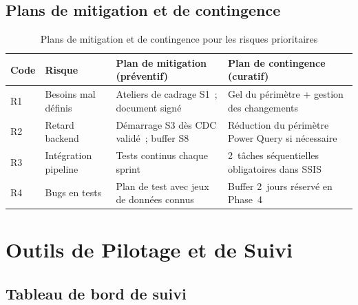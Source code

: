 \documentclass[12pt, a4paper]{report}
\begin{document}
\subsection{Plans de mitigation et de contingence}

\begin{table}[H]
\centering
\caption{Plans de mitigation et de contingence pour les risques prioritaires}
\label{tab:mitigation}
\renewcommand{\arraystretch}{1.4}
\begin{tabularx}{\textwidth}{p{0.7cm} X p{5cm} p{5cm}}
\toprule
\rowcolor{primary!12}
Code & Risque & Plan de mitigation (préventif) & Plan de contingence (curatif) \\
\midrule
R1 & Besoins mal définis & Ateliers de cadrage S1~; document signé & Gel du périmètre + gestion des changements \\
R2 & Retard backend & Démarrage S3 dès CDC validé~; buffer S8 & Réduction du périmètre Power Query si nécessaire \\
R3 & Intégration pipeline & Tests continus chaque sprint & 2~tâches séquentielles obligatoires dans SSIS \\
R4 & Bugs en tests & Plan de test avec jeux de données connus & Buffer 2~jours réservé en Phase~4 \\
\bottomrule
\end{tabularx}
\end{table}

\newpage
\section{Outils de Pilotage et de Suivi}

\subsection{Tableau de bord de suivi}
\end{document}

